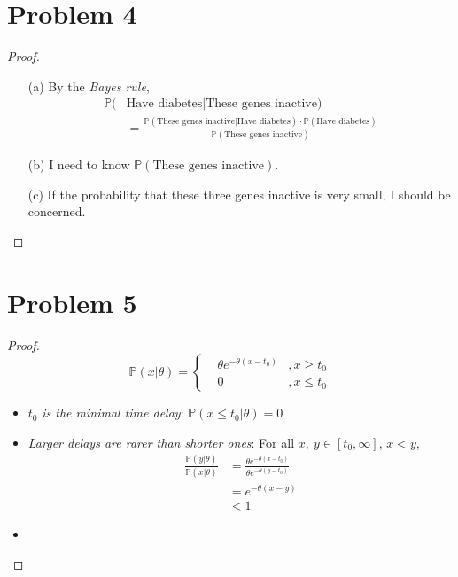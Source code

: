\documentclass{article}
\begin{document}
\section*{Problem 4}
    \begin{proof}
        \indent
        \begin{itemize}
            \item[(a)]
                By the \textit{Bayes rule},
                \begin{align*}
                    \mathbb{P}(&\text{Have diabetes}|\text{These genes inactive})\\
                    &= \frac{\mathbb{P}(\text{These genes inactive}|\text{Have diabetes})\cdot \mathbb{P}(\text{Have diabetes})}{\mathbb{P}(\text{These genes inactive})}
                \end{align*}
            \item[(b)]
            I need to know $\mathbb{P}(\text{These genes inactive})$.
            \item[(c)]
                If the probability that these three genes inactive is very small,
                I should be concerned.
        \end{itemize}
    \end{proof}

\section*{Problem 5}
    \begin{proof}
        \begin{equation*}
            \mathbb{P}(x|\theta)=\left\{
                \begin{array}{rcl}
                &\theta e^{-\theta(x-t_0)} & ,{x \geqslant t_0}\\
                &0 & ,{x \leqslant t_0}
                \end{array} \right.
        \end{equation*}
        \begin{itemize}
            \item $t_0$ \textit{is the minimal time delay}:
                    $\mathbb{P}(x\leqslant t_0|\theta) = 0$
            \item \textit{Larger delays are rarer than shorter ones}:
                    For all $x,\ y\in [t_0,\infty]$, $x<y$,
                    \begin{align*}
                        \frac{\mathbb{P}(y|\theta)}{\mathbb{P}(x|\theta)}
                        &=\frac{\theta e^{-\theta(x-t_0)}}{\theta e^{-\theta(y-t_0)}}\\
                        &=e^{-\theta(x-y)}\\
                        &<1
                    \end{align*}
            \item
        \end{itemize}
    \end{proof}
\end{document}
